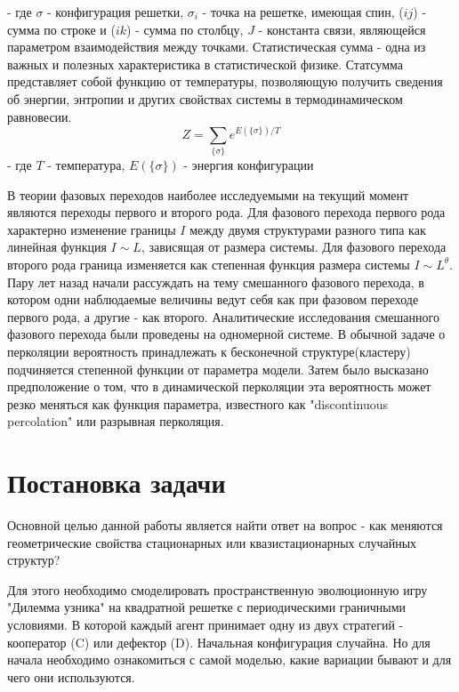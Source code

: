 \documentclass[12pt,a4paper]{article}
\begin{document}
	- где $\sigma$ - конфигурация решетки, $\sigma_{i}$ - точка на решетке, имеющая спин, ($ij$) - сумма по строке и ($ik$) - сумма по столбцу, $J$ - константа связи, являющейся параметром взаимодействия между точками. Статистическая сумма - одна из важных и полезных характеристика в статистической физике. Статсумма представляет собой функцию от температуры, позволяющую получить сведения об энергии, энтропии и других свойствах системы в термодинамическом равновесии. 
	\begin{equation}\label{statsum}
		Z = \sum_{\{\sigma\}}e^{E(\{\sigma\})/T}
	\end{equation}
	- где $T$ - температура, $E(\{\sigma\})$ - энергия конфигурации
	
	\par В теории фазовых переходов наиболее исследуемыми на текущий момент являются переходы первого и второго рода. Для фазового перехода первого рода характерно изменение границы $I$ между двумя структурами разного типа как линейная функция $I \sim L$, зависящая от размера системы. Для фазового перехода второго рода граница изменяется как степенная функция размера системы $I \sim L^{\theta}$. Пару лет назад начали рассуждать на тему смешанного фазового перехода, в котором одни наблюдаемые величины ведут себя как при фазовом переходе первого рода, а другие - как второго. Аналитические исследования смешанного фазового перехода были проведены на одномерной системе. В обычной задаче о перколяции вероятность принадлежать к бесконечной структуре(кластеру)	подчиняется степенной функции от параметра модели. Затем было высказано предположение о том, что в динамической перколяции эта вероятность может резко меняться как функция параметра, известного как "discontinuous percolation" или разрывная перколяция. 
	
	\section{Постановка задачи}
	
	\par Основной целью данной работы является найти ответ на вопрос - как меняются геометрические свойства стационарных или квазистационарных случайных структур?
	
	\par Для этого необходимо смоделировать пространственную эволюционную игру "Дилемма узника" на квадратной решетке с периодическими граничными условиями. В которой каждый агент принимает одну из двух стратегий - кооператор (C) или дефектор (D). Начальная конфигурация случайна. Но для начала необходимо ознакомиться с самой моделью, какие вариации бывают и для чего они используются.
	
\end{document}
